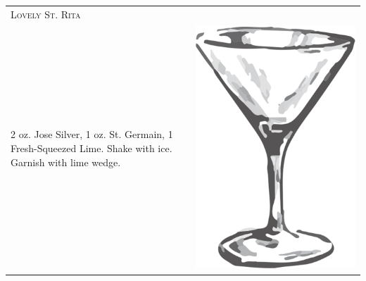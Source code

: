 \documentclass{article}
\begin{document}
\begin{multicols}{2}
\begin{tabular}{p{2in} p{0.5in}}
\multicolumn{2}{p{3in}}{\centering\Huge\textsc{Lovely St. Rita}} \\ 
  \vspace{-0.1in}2 oz. Jose Silver, 1 oz. St. Germain, 1 Fresh-Squeezed Lime. Shake with ice.  Garnish with lime wedge. &
  \vspace{-0.1in} \includegraphics{goblet.png}
\end{tabular}


\end{multicols}
\end{document}
